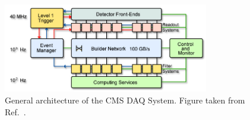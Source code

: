 \begin{figure}[htpb]
  \centering
  \includegraphics[width=0.8\textwidth]{figures/cms/cms_event_builder}
  \caption{ General architecture of the CMS DAQ System. Figure taken from
Ref.~\cite{Bayatian:922757}.
  \label{fig:cms_event_builder}}
\end{figure}

